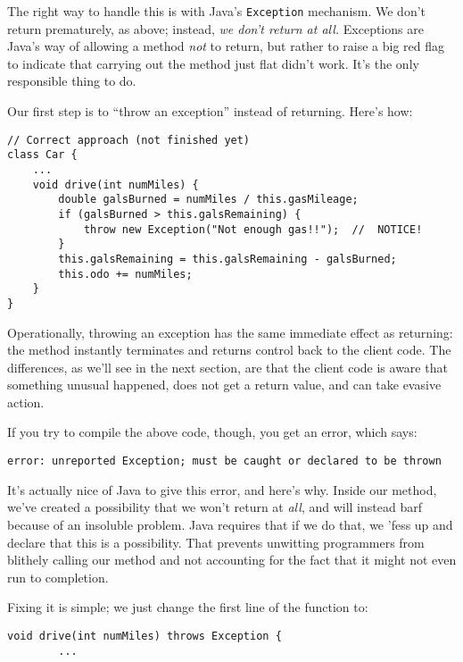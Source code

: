 The right way to handle this is with Java's \texttt{Exception} mechanism. We
don't return prematurely, as above; instead, \textit{we don't return at all.}
Exceptions are Java's way of allowing a method \textit{not} to return, but
rather to raise a big red flag to indicate that carrying out the method just
flat didn't work. It's the only responsible thing to do.

Our first step is to ``throw an exception'' instead of returning. Here's how:

\begin{Verbatim}[samepage=true,fontsize=\footnotesize,frame=single]
// Correct approach (not finished yet)
class Car {
    ...
    void drive(int numMiles) {
        double galsBurned = numMiles / this.gasMileage;
        if (galsBurned > this.galsRemaining) {
            throw new Exception("Not enough gas!!");  //  NOTICE!
        }
        this.galsRemaining = this.galsRemaining - galsBurned;
        this.odo += numMiles;
    }
}
\end{Verbatim}

Operationally, throwing an exception has the same immediate effect as
returning: the method instantly terminates and returns control back to the
client code. The differences, as we'll see in the next section, are that the
client code is aware that something unusual happened, does not get a return
value, and can take evasive action.

If you try to compile the above code, though, you get an error, which says:

\begin{Verbatim}[samepage=true,fontsize=\scriptsize]
  error: unreported Exception; must be caught or declared to be thrown
\end{Verbatim}

It's actually nice of Java to give this error, and here's why. Inside our
method, we've created a possibility that we won't return at \textit{all}, and
will instead barf because of an insoluble problem. Java requires that if we do
that, we 'fess up and declare that this is a possibility. That prevents
unwitting programmers from blithely calling our method and not accounting for
the fact that it might not even run to completion.

Fixing it is simple; we just change the first line of the function to:

\begin{Verbatim}[samepage=true,fontsize=\footnotesize,frame=single]
    void drive(int numMiles) throws Exception {
        ...
\end{Verbatim}

